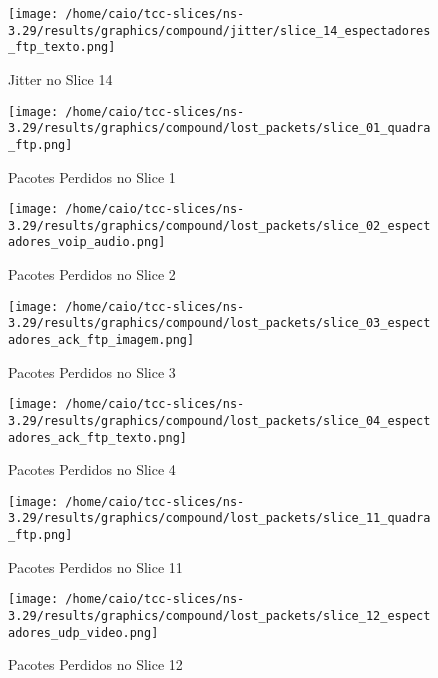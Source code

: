 \documentclass[12pt, a4paper]{article}
\begin{document}
\begin{figure}[H]
	\centering
	\texttt{[image: /home/caio/tcc-slices/ns-3.29/results/graphics/compound/jitter/slice\_14\_espectadores\_ftp\_texto.png]}
	\caption{Jitter no Slice 14}
	\label{jitter14}
\end{figure}

\begin{figure}[H]
	\centering
	\texttt{[image: /home/caio/tcc-slices/ns-3.29/results/graphics/compound/lost\_packets/slice\_01\_quadra\_ftp.png]}
	\caption{Pacotes Perdidos no Slice 1}
	\label{lost_packets1}
\end{figure}

\begin{figure}[H]
	\centering
	\texttt{[image: /home/caio/tcc-slices/ns-3.29/results/graphics/compound/lost\_packets/slice\_02\_espectadores\_voip\_audio.png]}
	\caption{Pacotes Perdidos no Slice 2}
	\label{lost_packets2}
\end{figure}

\begin{figure}[H]
	\centering
	\texttt{[image: /home/caio/tcc-slices/ns-3.29/results/graphics/compound/lost\_packets/slice\_03\_espectadores\_ack\_ftp\_imagem.png]}
	\caption{Pacotes Perdidos no Slice 3}
	\label{lost_packets3}
\end{figure}

\begin{figure}[H]
	\centering
	\texttt{[image: /home/caio/tcc-slices/ns-3.29/results/graphics/compound/lost\_packets/slice\_04\_espectadores\_ack\_ftp\_texto.png]}
	\caption{Pacotes Perdidos no Slice 4}
	\label{lost_packets4}
\end{figure}

\begin{figure}[H]
	\centering
	\texttt{[image: /home/caio/tcc-slices/ns-3.29/results/graphics/compound/lost\_packets/slice\_11\_quadra\_ftp.png]}
	\caption{Pacotes Perdidos no Slice 11}
	\label{lost_packets11}
\end{figure}

\begin{figure}[H]
	\centering
	\texttt{[image: /home/caio/tcc-slices/ns-3.29/results/graphics/compound/lost\_packets/slice\_12\_espectadores\_udp\_video.png]}
	\caption{Pacotes Perdidos no Slice 12}
	\label{lost_packets12}
\end{figure}
\end{document}
